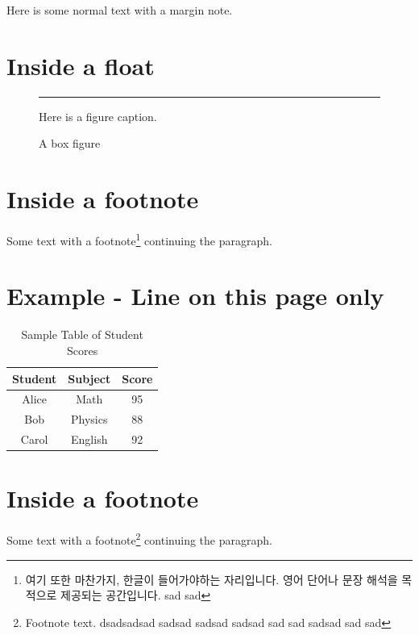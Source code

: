 \documentclass[12pt]{book}
\begin{document}
  Here is some normal text with a margin note.

  \section{Inside a float}

  \begin{figure}[ht]
    \centering
    \rule{3cm}{2cm}
    \caption{A box figure}
    Here is a figure caption. 
  \end{figure}

  \section{Inside a footnote}

  Some text with a footnote\footnote{여기 또한 마찬가지, 한글이 들어가야하는 자리입니다. 영어 단어나 문장 해석을 목적으로 제공되는 공간입니다.
  \lipsum[1] sad sad } continuing the paragraph.






  \newpage
  \section*{Example - Line on this page only}

  \lipsum[1-2]
  \begin{table}[h!]
    \centering
    \caption{Sample Table of Student Scores} %
    \begin{tabular}{|c|c|c|}
      \hline
      Student & Subject & Score \\
      \hline
      Alice   & Math    & 95    \\
      Bob     & Physics & 88    \\
      Carol   & English & 92    \\
      \hline
    \end{tabular}
    \label{tab:scores} %
  \end{table}

  \section{Inside a footnote}

  Some text with a footnote\footnote{Footnote text. 
  dsadsadsad 
  sadsad sadsad sadsad sad sad sadsad \lipsum[1-2] sad sad } continuing the paragraph.
\end{document}
